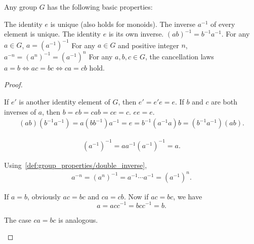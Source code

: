 \begin{proposition}\label{def:group_properties}
  Any group \( G \) has the following basic properties:
  \begin{defenum}
     The identity \( e \) is unique (also holds for monoids).
     The inverse \( a^{-1} \) of every element is unique.
     The identity \( e \) is its own inverse.
     \( (ab)^{-1} = b^{-1} a^{-1} \).
     For any \( a \in G \), \( a = (a^{-1})^{-1} \)
     For any \( a \in G \) and positive integer \( n \), \( a^{-n} = (a^n)^{-1} = (a^{-1})^n \)
     For any \( a, b, c \in G \), the cancellation laws \( a = b \iff ac = bc \iff ca = cb \) hold.
  \end{defenum}
\end{proposition}
\begin{proof}\mbox{}
  \begin{itemize}
     If \( e' \) is another identity element of \( G \), then \( e' = e' e = e \).
     If \( b \) and \( c \) are both inverses of \( a \), then \( b = eb = cab = ce = c \).
     \( ee = e \).
    \begin{align*}
      (ab) (b^{-1} a^{-1})
      =
      a (b b^{-1}) a^{-1}
      =
      e
      =
      b^{-1} (a^{-1} a) b
      =
      (b^{-1} a^{-1}) (ab).
    \end{align*}

    \begin{align*}
      (a^{-1})^{-1}
      =
      a a^{-1} (a^{-1})^{-1}
      =
      a.
    \end{align*}

     Using~\ref{def:group_properties/double_inverse},
    \begin{align*}
      a^{-n}
      =
      (a^n)^{-1}
      =
      a^{-1} \cdots a^{-1}
      =
      (a^{-1})^n.
    \end{align*}

     If \( a = b \), obviously \( ac = bc \) and \( ca = cb \). Now if \( ac = bc \), we have
    \begin{equation*}
      a = acc^{-1} = bcc^{-1} = b.
    \end{equation*}

    The case \( ca = bc \) is analogous.
  \end{itemize}
\end{proof}

